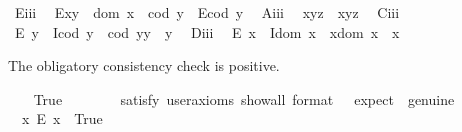 \begin{isabellebody}
\ E\isactrlsub i\isactrlsub i\isactrlsub i{\isacharcolon}\ %
\ {\isachardoublequoteopen}E{\isacharparenleft}x{\isasymcdot}y{\isacharparenright}\ \isactrlbold {\isasymleftarrow}\ {\isacharparenleft}dom\ x\ {\isasymcong}\ cod\ y\ \isactrlbold {\isasymand}\ E{\isacharparenleft}cod\ y{\isacharparenright}{\isacharparenright}{\isachardoublequoteclose}\ \isanewline
\ A\isactrlsub i\isactrlsub i\isactrlsub i{\isacharcolon}\ %
\ {\isachardoublequoteopen}x{\isasymcdot}{\isacharparenleft}y{\isasymcdot}z{\isacharparenright}\ {\isasymcong}\ {\isacharparenleft}x{\isasymcdot}y{\isacharparenright}{\isasymcdot}z{\isachardoublequoteclose}\ \isanewline
\ C\isactrlsub i\isactrlsub i\isactrlsub i{\isacharcolon}\ %
\ {\isachardoublequoteopen}E\ y\ \isactrlbold {\isasymrightarrow}\ {\isacharparenleft}I{\isacharparenleft}cod\ y{\isacharparenright}\ \isactrlbold {\isasymand}\ {\isacharparenleft}cod\ y{\isacharparenright}{\isasymcdot}y\ {\isasymcong}\ y{\isacharparenright}{\isachardoublequoteclose}\ \isanewline
\ D\isactrlsub i\isactrlsub i\isactrlsub i{\isacharcolon}\ %
\ {\isachardoublequoteopen}E\ x\ \isactrlbold {\isasymrightarrow}\ {\isacharparenleft}I{\isacharparenleft}dom\ x{\isacharparenright}\ \isactrlbold {\isasymand}\ x{\isasymcdot}{\isacharparenleft}dom\ x{\isacharparenright}\ {\isasymcong}\ x{\isacharparenright}{\isachardoublequoteclose}%
\begin{isamarkuptext}%
The obligatory consistency check is positive.%
\end{isamarkuptext}\isamarkuptrue%
\ \ \isamarkupfalse%
\ True\ \ %
\isanewline
\ \ \ \ \isamarkupfalse%
\ {\isacharbrackleft}satisfy{\isacharcomma}\ user{\isacharunderscore}axioms{\isacharcomma}\ show{\isacharunderscore}all{\isacharcomma}\ format\ {\isacharequal}\ {}{\isacharcomma}\ expect\ {\isacharequal}\ genuine{\isacharbrackright}%
\isadelimproof
\ %
\endisadelimproof
%
\isatagproof
{}\isamarkupfalse%
%
\endisatagproof
{\isafoldproof}%
%
\isadelimproof
%
\endisadelimproof
\isanewline
\ \ \isamarkupfalse%
\ \ {\isachardoublequoteopen}{\isasymexists}x{\isachardot}\ \isactrlbold {\isasymnot}{\isacharparenleft}E\ x{\isacharparenright}{\isachardoublequoteclose}\ \ True\ \ %
\end{isabellebody}
